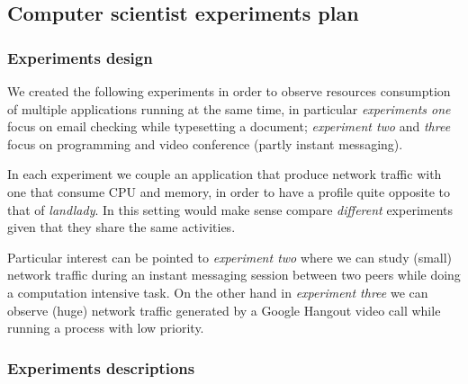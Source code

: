 \documentclass[10pt,a4paper]{article}
\begin{document}
    \newpage
    \subsection{Computer scientist experiments plan}

    \subsubsection*{Experiments design }
    We created the following experiments in order to observe resources
    consumption of multiple applications running at the same time, in
    particular \emph{experiments one} focus on email checking while
    typesetting a document; \emph{experiment two} and \emph{three}
    focus on programming and video conference (partly instant
    messaging).

    In each experiment we couple an application that produce network
    traffic with one that consume CPU and memory, in order to have a
    profile quite opposite to that of \emph{landlady}. In this setting
    would make sense compare \emph{different} experiments given that
    they share the same activities.

    Particular interest can be pointed to \emph{experiment two} where
    we can study (small) network traffic during an instant messaging
    session between two peers while doing a computation intensive
    task. On the other hand in \emph{experiment three} we can observe
    (huge) network traffic generated by a Google Hangout video call
    while running a process with low priority.

    \subsubsection*{Experiments descriptions}
    
\end{document}
